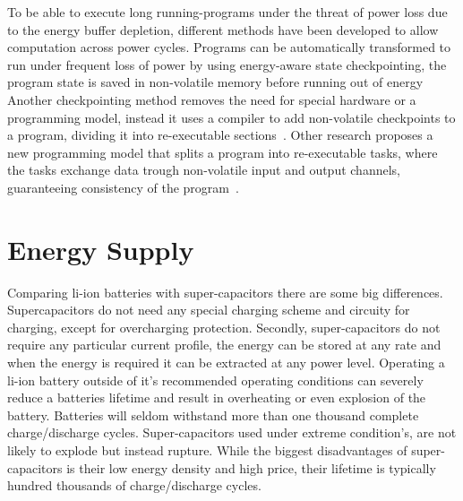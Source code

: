 To be able to execute long running-programs under the threat of power loss due to the energy buffer depletion, different methods have been developed to allow computation across power cycles.
Programs can be automatically transformed to run under frequent loss of power by using energy-aware state checkpointing, the program state is saved in non-volatile memory before running out of energy~\cite{ransford_asplos_2011}
Another checkpointing method removes the need for special hardware or a programming model, instead it uses a compiler to add non-volatile checkpoints to a program, dividing it into re-executable sections~\cite{vanderwoude_osdi_2016}.
Other research proposes a new programming model that splits a program into re-executable tasks, where the tasks exchange data trough non-volatile input and output channels, guaranteeing consistency of the program~\cite{Colin_oopsla_2017}.



\section{Energy Supply}
\label{sec:energy_supply}





Comparing li-ion batteries with super-capacitors there are some big differences.
Supercapacitors do not need any special charging scheme and circuity for charging, except for overcharging protection.
Secondly, super-capacitors do not require any particular current profile, the energy can be stored at any rate and when the energy is required it can be extracted at any power level.
Operating a li-ion battery outside of it's recommended operating conditions can severely reduce a batteries lifetime and result in overheating or even explosion of the battery.
Batteries will seldom withstand more than one thousand complete charge/discharge cycles.
Super-capacitors used under extreme condition's, are not likely to explode but instead rupture.
While the biggest disadvantages of super-capacitors is their low energy density and high price, their lifetime is typically hundred thousands of charge/discharge cycles.

